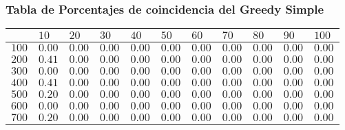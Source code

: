 \documentclass[12pt]{article}
\begin{document}
\subsubsection*{Tabla de Porcentajes de coincidencia del Greedy Simple}
\begin{tabu}{|@{}*{11}{p{1.4cm}@{}|}}
%
& $10$ & $20$ & $30$ & $40$ & $50$ & $60$ & $70$ & $80$ & $90$ & $100$ \\\hline
$100$ & $0.00$ & $0.00$ & $0.00$ & $0.00$ & $0.00$ & $0.00$ & $0.00$ & $0.00$ & $0.00$ & $0.00$ \\\hline
$200$ & $0.41$ & $0.00$ & $0.00$ & $0.00$ & $0.00$ & $0.00$ & $0.00$ & $0.00$ & $0.00$ & $0.00$ \\\hline
$300$ & $0.00$ & $0.00$ & $0.00$ & $0.00$ & $0.00$ & $0.00$ & $0.00$ & $0.00$ & $0.00$ & $0.00$ \\\hline
$400$ & $0.41$ & $0.00$ & $0.00$ & $0.00$ & $0.00$ & $0.00$ & $0.00$ & $0.00$ & $0.00$ & $0.00$ \\\hline
$500$ & $0.20$ & $0.00$ & $0.00$ & $0.00$ & $0.00$ & $0.00$ & $0.00$ & $0.00$ & $0.00$ & $0.00$ \\\hline
$600$ & $0.00$ & $0.00$ & $0.00$ & $0.00$ & $0.00$ & $0.00$ & $0.00$ & $0.00$ & $0.00$ & $0.00$ \\\hline
$700$ & $0.20$ & $0.00$ & $0.00$ & $0.00$ & $0.00$ & $0.00$ & $0.00$ & $0.00$ & $0.00$ & $0.00$ \\\hline

\end{tabu}
\end{document}
